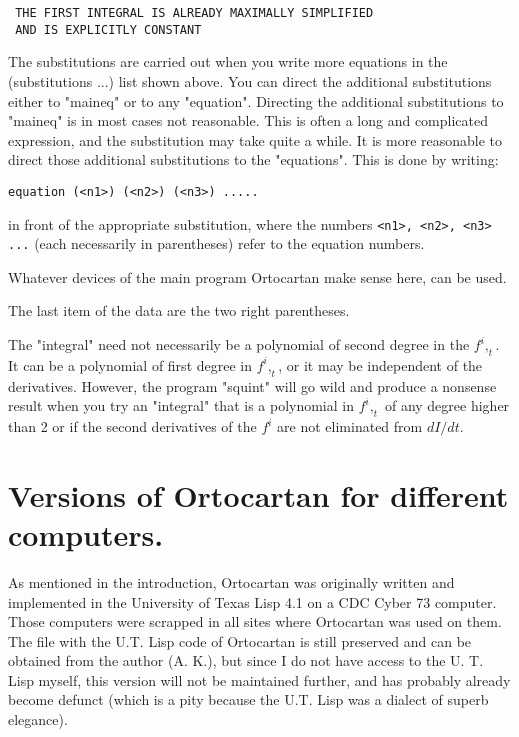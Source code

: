 \bigskip

\begin{verbatim}
 THE FIRST INTEGRAL IS ALREADY MAXIMALLY SIMPLIFIED
 AND IS EXPLICITLY CONSTANT
\end{verbatim}

\bigskip

The substitutions are carried out when you write more equations in the
(substitutions ...) list shown above. You can direct the additional
substitutions either to "maineq" or to any "equation". Directing the additional
substitutions to "maineq" is in most cases not reasonable. This is often a long
and complicated expression, and the substitution may take quite a while. It is
more reasonable to direct those additional substitutions to the "equations".
This is done by writing:

\bigskip

\begin{verbatim}
equation (<n1>) (<n2>) (<n3>) .....
\end{verbatim}

\bigskip

\noindent in front of the appropriate substitution, where the numbers
\verb+<n1>, <n2>, <n3> ...+ (each necessarily in parentheses) refer to the
equation numbers.

Whatever devices of the main program Ortocartan make sense here, can be used.

The last item of the data are the two right parentheses.

The "integral" need not necessarily be a polynomial of second degree in the
${f^i},_t$. It can be a polynomial of first degree in ${f^i},_t$, or it may be
independent of the derivatives. However, the program "squint" will go wild and
produce a nonsense result when you try an "integral" that is a polynomial in
${f^i},_t$ of any degree higher than 2 or if the second derivatives of the
${f^i}$ are not eliminated from $dI/dt$.

\section{Versions of Ortocartan for different computers.}

As  mentioned  in  the  introduction,  Ortocartan   was
     originally written and  implemented  in  the  University  of
     Texas Lisp 4.1 on a CDC Cyber 73 computer.  Those  computers
     were scrapped in all sites  where  Ortocartan  was  used  on
     them. The file with the U.T.  Lisp  code  of  Ortocartan  is
     still preserved and can be obtained  from  the
     author (A. K.), but since I do not have access to the U.  T.
     Lisp myself, this version will not  be  maintained  further,
     and has probably already become defunct (which is  a
     pity  because  the  U.T.  Lisp  was  a  dialect  of   superb
     elegance).

